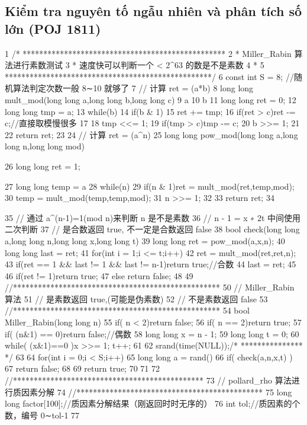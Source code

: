 \documentclass[11pt]{article}
\begin{document}
\subsection{Kiểm tra nguyên tố ngẫu nhiên và phân tích số lớn (POJ 1811)}

\begin{Code}
 1   /* *************************************************
 2    * Miller_Rabin 算法进行素数测试
 3    * 速度快可以判断一个 < 2^63 的数是不是素数
 4    *
 5    **************************************************/
 6   const int S = 8; //随机算法判定次数一般 8∼10 就够了
 7   // 计算 ret = (a*b)%
 8   long long mult_mod(long long a,long long b,long long c){
 9       a %
10       b %
11       long long ret = 0;
12       long long tmp = a;
13       while(b){
14           if(b & 1){
15               ret += tmp;
16               if(ret > c)ret -= c;//直接取模慢很多
17           }
18           tmp <<= 1;
19           if(tmp > c)tmp -= c;
20           b >>= 1;
21       }
22       return ret;
23   }
24   // 计算 ret = (a^n)%
25   long long pow_mod(long long a,long long n,long long mod){
26       long long ret = 1;


27       long long temp = a%
28       while(n){
29           if(n & 1)ret = mult_mod(ret,temp,mod);
30           temp = mult_mod(temp,temp,mod);
31           n >>= 1;
32       }
33       return ret;
34   }
35   // 通过 a^(n-1)=1(mod n)来判断 n 是不是素数
36   // n - 1 = x ∗ 2t 中间使用二次判断
37   // 是合数返回 true, 不一定是合数返回 false
38   bool check(long long a,long long n,long long x,long long t){
39       long long ret = pow_mod(a,x,n);
40       long long last = ret;
41       for(int i = 1;i <= t;i++){
42            ret = mult_mod(ret,ret,n);
43            if(ret == 1 && last != 1 && last != n-1)return true;//合数
44            last = ret;
45       }
46       if(ret != 1)return true;
47       else return false;
48   }
49   //**************************************************
50   // Miller_Rabin 算法
51   // 是素数返回 true,(可能是伪素数)
52   // 不是素数返回 false
53   //**************************************************
54   bool Miller_Rabin(long long n){
55       if( n < 2)return false;
56       if( n == 2)return true;
57       if( (n&1) == 0)return false;//偶数
58       long long x = n - 1;
59       long long t = 0;
60       while( (x&1)==0 ){x >>= 1; t++;}
61
62       srand(time(NULL));/* *************** */
63
64       for(int i = 0;i < S;i++){
65           long long a = rand()%
66           if( check(a,n,x,t) )
67               return false;
68       }
69       return true;
70   }
71
72   //**********************************************
73   // pollard_rho 算法进行质因素分解
74   //*********************************************
75   long long factor[100];//质因素分解结果（刚返回时时无序的）
76   int tol;//质因素的个数，编号 0∼tol-1
77



\end{Code}
\end{document}
